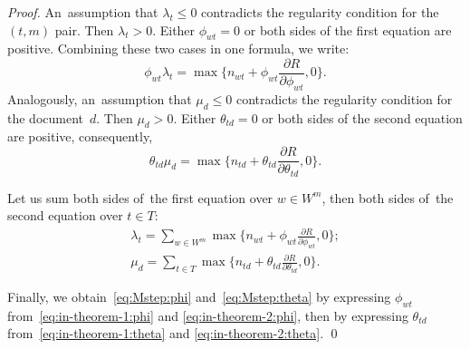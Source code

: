 \documentclass{sig-alternate-2013}
\begin{document}
\begin{proof}
    An~assumption that $\lambda_t\leq 0$ contradicts the regularity condition for the $(t,m)$ pair.
    Then ${\lambda_t>0}$.
    Either ${\phi_{wt}= 0}$ or both sides of the first equation are positive.
    Combining these two cases in one formula, we write:
    \begin{equation}
    \label{eq:in-theorem-1:phi}
        \phi_{wt} \lambda_t
        =
        \max\biggl\{
        n_{wt} + \phi_{wt} \frac{\partial R}{\partial \phi_{wt}}, 0
        \biggr\}.
    \end{equation}
    Analogously,
    an~assumption that $\mu_d\leq 0$ contradicts the regularity condition for the document~$d$.
    Then ${\mu_d>0}$.
    Either ${\theta_{td}= 0}$ or both sides of the second equation are positive,
    consequently,
    \begin{equation}
    \label{eq:in-theorem-1:theta}
        \theta_{td} \mu_d
        =
        \max\biggl\{
        n_{td} + \theta_{td} \frac{\partial R}{\partial \theta_{td}}, 0
        \biggr\}.
    \end{equation}

    Let us sum
    both sides of~the first equation over ${w\in W^m}$,
    then
    both sides of~the second equation over ${t\in T}$:
    \begin{gather}
    \label{eq:in-theorem-2:phi}
        \lambda_t
        =
        \sum_{w\in W^m}
        \max\biggl\{
        n_{wt} + \phi_{wt} \frac{\partial R}{\partial \phi_{wt}}, 0
        \biggr\};
    \\
    \label{eq:in-theorem-2:theta}
        \mu_d
        =
        \sum_{t\in T}
        \max\biggl\{
        n_{td} + \theta_{td} \frac{\partial R}{\partial \theta_{td}}, 0
        \biggr\}.
    \end{gather}

    Finally,
    we obtain~\eqref{eq:Mstep:phi} and~\eqref{eq:Mstep:theta}
    by expressing $\phi_{wt}$ from~\eqref{eq:in-theorem-1:phi} and \eqref{eq:in-theorem-2:phi},
    then
    by expressing $\theta_{td}$ from~\eqref{eq:in-theorem-1:theta} and \eqref{eq:in-theorem-2:theta}.
    \qed
\end{proof}
\end{document}
